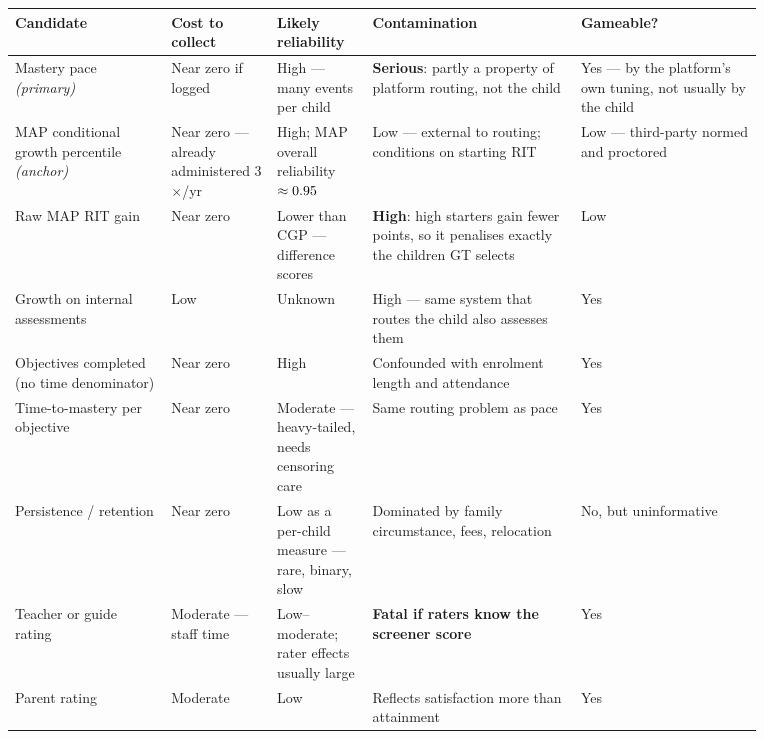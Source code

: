 \documentclass[11pt,a4paper]{article}
\begin{document}
\begin{center}
\footnotesize
\begin{tabular}{@{}p{0.185\linewidth}p{0.115\linewidth}p{0.115\linewidth}p{0.24\linewidth}p{0.215\linewidth}@{}}
\toprule
\textbf{Candidate} & \textbf{Cost to collect} & \textbf{Likely reliability} &
\textbf{Contamination} & \textbf{Gameable?} \\
\midrule
Mastery pace \newline \textit{(primary)} &
Near zero if logged &
High --- many events per child &
\textbf{Serious}: partly a property of platform routing, not the child &
Yes --- by the platform's own tuning, not usually by the child \\
\addlinespace
MAP conditional growth percentile \newline \textit{(anchor)} &
Near zero --- already administered 3$\times$/yr &
High; MAP overall reliability $\approx0.95$ &
Low --- external to routing; conditions on starting RIT &
Low --- third-party normed and proctored \\
\addlinespace
Raw MAP RIT gain &
Near zero &
Lower than CGP --- difference scores &
\textbf{High}: high starters gain fewer points, so it penalises exactly the
children GT selects &
Low \\
\addlinespace
Growth on internal assessments &
Low &
Unknown &
High --- same system that routes the child also assesses them &
Yes \\
\addlinespace
Objectives completed \newline (no time denominator) &
Near zero &
High &
Confounded with enrolment length and attendance &
Yes \\
\addlinespace
Time-to-mastery per objective &
Near zero &
Moderate --- heavy-tailed, needs censoring care &
Same routing problem as pace &
Yes \\
\addlinespace
Persistence / retention &
Near zero &
Low as a per-child measure --- rare, binary, slow &
Dominated by family circumstance, fees, relocation &
No, but uninformative \\
\addlinespace
Teacher or guide rating &
Moderate --- staff time &
Low--moderate; rater effects usually large &
\textbf{Fatal if raters know the screener score} &
Yes \\
\addlinespace
Parent rating &
Moderate &
Low &
Reflects satisfaction more than attainment &
Yes \\
\bottomrule
\end{tabular}
\end{center}
\end{document}
